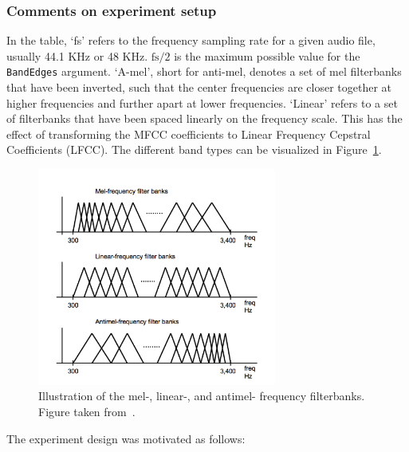 \subsubsection{Comments on experiment setup}

In the table, `fs' refers to the frequency sampling rate for a given audio file,
usually 44.1 KHz or 48 KHz. $\text{fs}/2$ is the maximum possible value for the
\texttt{BandEdges} argument. `A-mel', short for anti-mel, denotes a set of mel
filterbanks that have been inverted, such that the center frequencies are closer
together at higher frequencies and further apart at lower frequencies. `Linear'
refers to a set of filterbanks that have been spaced linearly on the frequency
scale. This has the effect of transforming the MFCC coefficients to Linear
Frequency Cepstral Coefficients (LFCC). The different band types can be
visualized in Figure~\ref{fig:filterbanks}.

\begin{figure}[ht]
  \centering
  \includegraphics[width=0.7\textwidth]{figures/filterbanks.png}
  \caption{Illustration of the mel-, linear-, and antimel- frequency
  filterbanks. Figure taken from~\cite{lei2009mel}.}\label{fig:filterbanks}
\end{figure}

The experiment design was motivated as follows:

